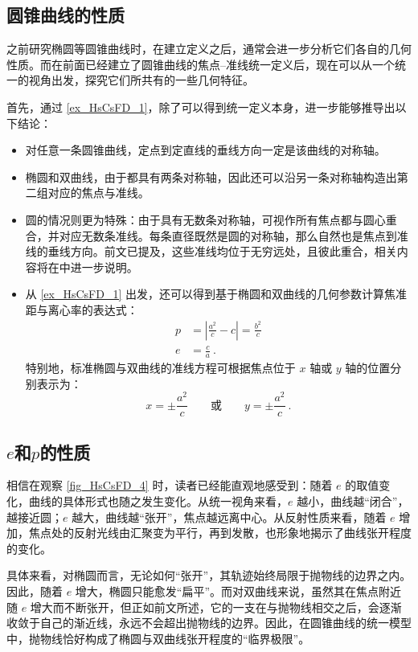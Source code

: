 \subsection{圆锥曲线的性质}

之前研究椭圆等圆锥曲线时，在建立定义之后，通常会进一步分析它们各自的几何性质。而在前面已经建立了圆锥曲线的焦点–准线统一定义后，现在可以从一个统一的视角出发，探究它们所共有的一些几何特征。

首先，通过 \autoref{ex_HsCsFD_1}，除了可以得到统一定义本身，进一步能够推导出以下结论：
\begin{itemize}
\item 对任意一条圆锥曲线，定点到定直线的垂线方向一定是该曲线的对称轴。
\item 椭圆和双曲线，由于都具有两条对称轴，因此还可以沿另一条对称轴构造出第二组对应的焦点与准线。
\item 圆的情况则更为特殊：由于具有无数条对称轴，可视作所有焦点都与圆心重合，并对应无数条准线。每条直径既然是圆的对称轴，那么自然也是焦点到准线的垂线方向。前文已提及，这些准线均位于无穷远处，且彼此重合，相关内容将在中进一步说明。
\item 从 \autoref{ex_HsCsFD_1} 出发，还可以得到基于椭圆和双曲线的几何参数计算焦准距与离心率的表达式：
\begin{equation}
\begin{split}
p &= \left| \frac{a^2}{c} - c \right| = \frac{b^2}{c}\\
e &= \frac{c}{a}~.
\end{split}
\end{equation}
特别地，标准椭圆与双曲线的准线方程可根据焦点位于 $x$ 轴或 $y$ 轴的位置分别表示为：
\begin{equation}
x = \pm\frac{a^2}{c} \qquad \text{或} \qquad y = \pm\frac{a^2}{c}~.
\end{equation}
\end{itemize}

\subsection{$e$和$p$的性质}

相信在观察 \autoref{fig_HsCsFD_4} 时，读者已经能直观地感受到：随着 $e$ 的取值变化，曲线的具体形式也随之发生变化。从统一视角来看，$e$ 越小，曲线越“闭合”，越接近圆；$e$ 越大，曲线越“张开”，焦点越远离中心。从反射性质来看，随着 $e$ 增加，焦点处的反射光线由汇聚变为平行，再到发散，也形象地揭示了曲线张开程度的变化。

具体来看，对椭圆而言，无论如何“张开”，其轨迹始终局限于抛物线的边界之内。因此，随着 $e$ 增大，椭圆只能愈发“扁平”。而对双曲线来说，虽然其在焦点附近随 $e$ 增大而不断张开，但正如前文所述，它的一支在与抛物线相交之后，会逐渐收敛于自己的渐近线，永远不会超出抛物线的边界。因此，在圆锥曲线的统一模型中，抛物线恰好构成了椭圆与双曲线张开程度的“临界极限”。

